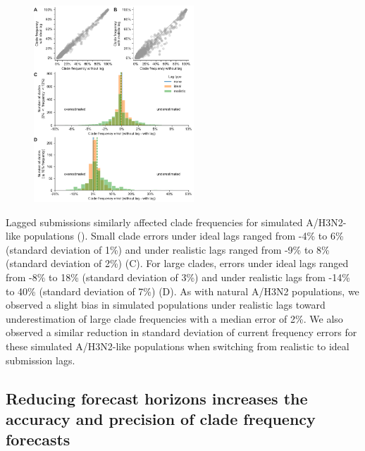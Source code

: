 \documentclass[9pt,lineno]{elife}
\begin{document}
\begin{figure}[htb!]
{\includegraphics[width=6cm]{figures/simulated_current_frequency_errors_by_delay}}\label{figsupp:simulated_current_clade_frequency_errors}
%
\label{figdata:h3n2_tip_attributes}
\label{figsrccode:current_clade_frequency_errors}
\end{figure}

Lagged submissions similarly affected clade frequencies for simulated A/H3N2-like populations ().
Small clade errors under ideal lags ranged from -4\% to 6\% (standard deviation of 1\%) and under realistic lags ranged from -9\% to 8\% (standard deviation of 2\%) (C).
For large clades, errors under ideal lags ranged from -8\% to 18\% (standard deviation of 3\%) and under realistic lags from -14\% to 40\% (standard deviation of 7\%) (D).
As with natural A/H3N2 populations, we observed a slight bias in simulated populations under realistic lags toward underestimation of large clade frequencies with a median error of 2\%.
We also observed a similar reduction in standard deviation of current frequency errors for these simulated A/H3N2-like populations when switching from realistic to ideal submission lags.

\subsection{Reducing forecast horizons increases the accuracy and precision of clade frequency forecasts}
\end{document}
